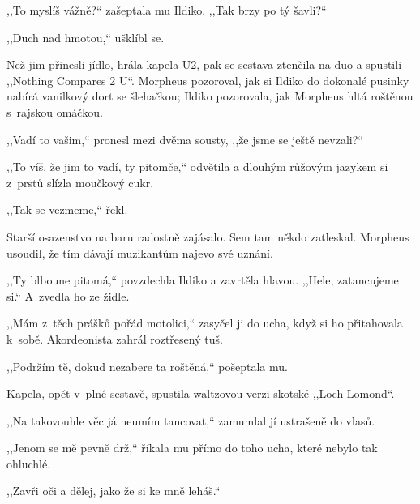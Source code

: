 ,,To myslíš vážně?`` zašeptala mu Ildiko. ,,Tak brzy po tý šavli?``

,,Duch nad hmotou,`` ušklíbl se.

Než jim přinesli jídlo, hrála kapela U2, pak se sestava ztenčila na duo a spustili ,,Nothing Compares 2 U``. Morpheus pozoroval, jak si Ildiko do dokonalé pusinky nabírá vanilkový dort se šlehačkou; Ildiko pozorovala, jak Morpheus hltá roštěnou s rajskou omáčkou.

,,Vadí to vašim,`` pronesl mezi dvěma sousty, ,,že jsme se ještě nevzali?``

,,To víš, že jim to vadí, ty pitomče,`` odvětila a dlouhým růžovým jazykem si z prstů slízla moučkový cukr.

,,Tak se vezmeme,`` řekl.

Starší osazenstvo na baru radostně zajásalo. Sem tam někdo zatleskal. Morpheus usoudil, že tím dávají muzikantům najevo své uznání.

,,Ty blboune pitomá,`` povzdechla Ildiko a zavrtěla hlavou. ,,Hele, zatancujeme si.`` A~zvedla ho ze židle.

,,Mám z těch prášků pořád motolici,`` zasyčel ji do ucha, když si ho přitahovala k sobě. Akordeonista zahrál roztřesený tuš. 

,,Podržím tě, dokud nezabere ta roštěná,`` pošeptala mu.

Kapela, opět v plné sestavě, spustila waltzovou verzi skotské ,,Loch Lomond``.

,,Na takovouhle věc já neumím tancovat,`` zamumlal jí ustrašeně do vlasů.

,,Jenom se mě pevně drž,`` říkala mu přímo do toho ucha, které nebylo tak ohluchlé. 

,,Zavři oči a dělej, jako že si ke mně leháš.``




